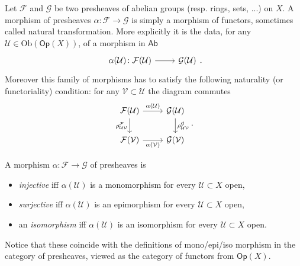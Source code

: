 \documentclass[../Main]{subfiles}
\begin{document}
\begin{defn}
	Let $\mathcal{F}$ and $\mathcal{G}$ be two presheaves of abelian groups
	(resp. rings, sets, ...) on $X$.
	A morphism of presheaves $\alpha\colon \mathcal{F} \to \mathcal{G}$ is simply
	a morphism of functors, sometimes called natural transformation.
	More explicitly it is the data, for any $\mathcal{U} \in \mathrm{Ob} \left(\mathsf{Op}(X)\right)$,
	of a morphism in $\mathsf{Ab}$
	\begin{equation}
		\begin{tikzcd}
			\alpha(\mathcal{U})\colon \mathcal{F}(\mathcal{U}) \arrow[r, "", rightarrow] &
		\mathcal{G}(\mathcal{U})
		\end{tikzcd}
	.\end{equation} 
	Moreover this family of morphisms has to satisfy the following naturality
	(or functoriality)
	condition: for any $\mathcal{V} \subset \mathcal{U}$ the diagram commutes
	\begin{equation}
	\begin{tikzcd}
		\mathcal{F}(\mathcal{U}) \arrow[r, "\alpha(\mathcal{U})", rightarrow] 
	\arrow[d, "\rho_{\mathcal{UV}}^{\mathcal{F}}"', rightarrow] &
		\mathcal{G}(\mathcal{U}) \arrow[d, "\rho_{\mathcal{UV}}^{\mathcal{G}}", rightarrow] \\
		\mathcal{F}(\mathcal{V}) \arrow[r, "\alpha(\mathcal{V})"', rightarrow] &
		\mathcal{G}(\mathcal{V})
	\end{tikzcd}
	.\end{equation} 
\end{defn}

\begin{defn}
	A morphism $\alpha\colon \mathcal{F} \to \mathcal{G}$ of presheaves is
	\begin{itemize}
		\item {\em injective} iff $\alpha(\mathcal{U})$ is a monomorphism for every
			$\mathcal{U} \subset X$ open,
		\item {\em surjective} iff $\alpha(\mathcal{U})$ is an epimorphism for every
			$\mathcal{U} \subset X$ open,
		\item an {\em isomorphism} iff $\alpha(\mathcal{U})$ is an isomorphism for every
			$\mathcal{U} \subset X$ open.
	\end{itemize}
	Notice that these coincide with the definitions of mono/epi/iso
	morphism in the category of presheaves, viewed as the category of
	functors from $\mathsf{Op}(X)$.
\end{defn}
\end{document}
